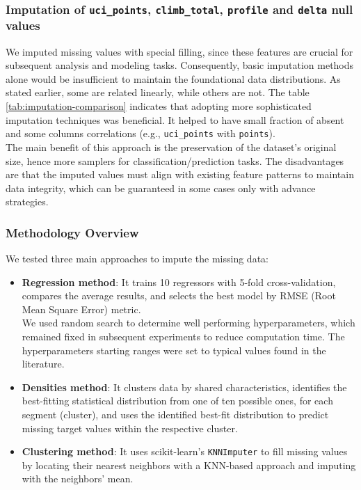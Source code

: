 \documentclass[a4paper, twoside]{article}
\begin{document}
\subsubsection{Imputation of \texttt{uci\_points}, \texttt{climb\_total}, \texttt{profile} and \texttt{delta} null values}
We imputed missing values with special filling, since these features are crucial for subsequent analysis and modeling tasks. Consequently, basic imputation methods alone would be insufficient to maintain the foundational data distributions. As stated earlier, some are related linearly, while others are not. The table \ref{tab:imputation-comparison} indicates that adopting more sophisticated imputation techniques was beneficial. It helped to have small fraction of absent and some columns correlations (e.g., \texttt{uci\_points} with \texttt{points}).
\\ The main benefit of this approach is the preservation of the dataset's original size, hence more samplers for classification/prediction tasks. The disadvantages are that the imputed values must align with existing feature patterns to maintain data integrity, which can be guaranteed in some cases  only with advance strategies.
\subsubsection{Methodology Overview}
We tested three main approaches to impute the missing data:
\begin{itemize}[noitemsep]
    \item \textbf{Regression method}: 
    It trains 10 regressors with 5-fold cross-validation, compares the average results, and selects the best model by RMSE (Root Mean Square Error) metric. \\ 
    We used random search to determine well performing hyperparameters, which remained fixed in subsequent experiments to reduce computation time. The hyperparameters starting ranges were set to typical values found in the literature.
    \item \textbf{Densities method}:
    It clusters data by shared characteristics, identifies the best-fitting statistical distribution from one of ten possible ones, for each segment (cluster), and uses the identified best-fit distribution to predict missing target values  within the respective cluster.
    \item \textbf{Clustering method}:
    It uses scikit-learn’s \texttt{KNNImputer} to fill missing values by locating their nearest neighbors with a KNN-based approach and imputing with the neighbors’ mean.
\end{itemize}
\end{document}

